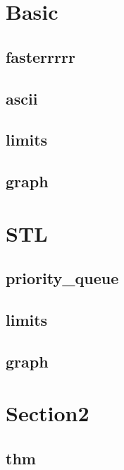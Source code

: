 \section{Basic}
    \subsection{fasterrrrr}
        
    \subsection{ascii}
        
    \subsection{limits}
            
    \subsection{graph}
        

\section{STL}
    \subsection{priority_queue}
        
    \subsection{limits}
            
    \subsection{graph}
        
        
\section{Section2}
    \subsection{thm}
        